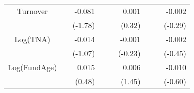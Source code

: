 \begin{singlespacing}
\begin{table}[H]
\begin{tabular}{crrrrrrrr}
Turnover    &                 & -0.081          &  &                           & 0.001                    &  &                           & -0.002                    \\
            &                 & (-1.78)         &  &                           & (0.32)                   &  &                           & (-0.29)                   \\
Log(TNA)     &                 & -0.014          &  &                           & -0.001                   &  &                           & -0.002                    \\
            &                 & (-1.07)         &  &                           & (-0.23)                  &  &                           & (-0.45)                   \\
Log(FundAge) &                 & 0.015           &  &                           & 0.006                    &  &                           & -0.010                    \\
            &                 & (0.48)          &  &                           & (1.45)                   &  &                           & (-0.60)                   \\ \hline
\end{tabular}
\end{table}
\end{singlespacing}

